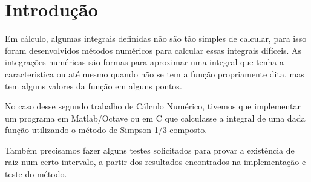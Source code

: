 \chapter*[Introdução]{Introdução}
Em cálculo, algumas integrais definidas não são tão simples de calcular, para
isso foram desenvolvidos métodos numéricos para calcular essas integrais
difíceis. As integrações numéricas são formas para aproximar uma integral que
tenha a caracteristica ou até mesmo quando não se tem a função propriamente
dita, mas tem alguns valores da função em alguns pontos.

No caso desse segundo trabalho de Cálculo Numérico, tivemos que implementar um
programa em Matlab/Octave ou em C que calculasse a integral de uma dada função
utilizando o método de Simpson 1/3 composto.

Também precisamos fazer alguns testes solicitados para provar a existência de
raiz num certo intervalo, a partir dos resultados encontrados na implementação e
teste do método.
